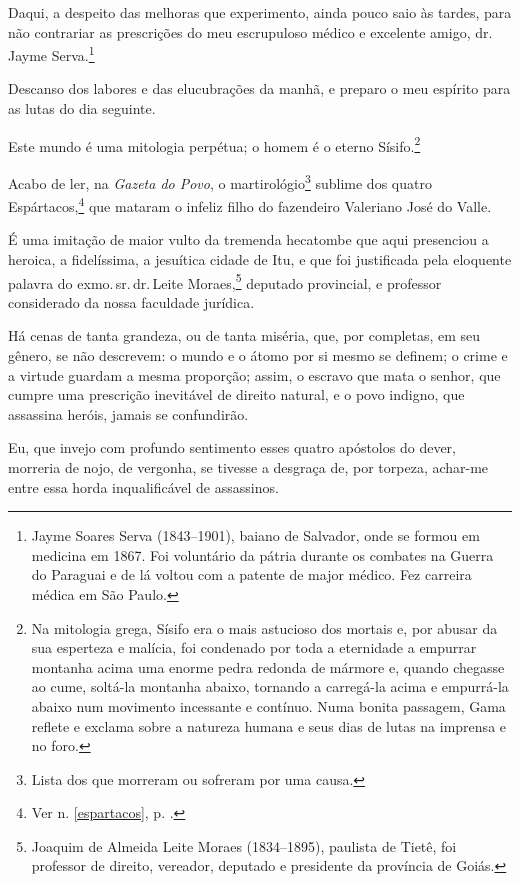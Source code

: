 Daqui, a despeito das melhoras que experimento, ainda pouco saio às
tardes, para não contrariar as prescrições do meu escrupuloso médico e
excelente amigo, dr.\,Jayme Serva.\footnote{Jayme Soares Serva
  (1843--1901), baiano de Salvador, onde se formou em medicina em 1867.
  Foi voluntário da pátria durante os combates na Guerra do Paraguai e
  de lá voltou com a patente de major médico. Fez carreira médica em São
  Paulo.}

Descanso dos labores e das elucubrações da manhã, e preparo o meu
espírito para as lutas do dia seguinte.

Este mundo é uma mitologia perpétua; o homem é o eterno Sísifo.\footnote{
  Na mitologia grega, Sísifo era o mais astucioso dos mortais e, por
  abusar da sua esperteza e malícia, foi condenado por toda a eternidade
  a empurrar montanha acima uma enorme pedra redonda de mármore e,
  quando chegasse ao cume, soltá-la montanha abaixo,
  tornando a carregá-la acima e empurrá-la abaixo num movimento
  incessante e contínuo. Numa bonita passagem, Gama reflete e exclama
  sobre a natureza humana e seus dias de lutas na imprensa e no foro.}

Acabo de ler, na \emph{Gazeta do Povo}, o martirológio\footnote{Lista
  dos que morreram ou sofreram por uma causa.} sublime dos quatro
Espártacos,\footnote{Ver n. \ref{espartacos}, p. \pageref{espartacos}.} que mataram o infeliz filho do fazendeiro Valeriano José do Valle.

É uma imitação de maior vulto da tremenda hecatombe que aqui presenciou
a heroica, a fidelíssima, a jesuítica cidade de Itu, e que foi
justificada pela eloquente palavra do exmo.\,sr.\,dr.\,Leite
Moraes,\footnote{Joaquim de Almeida Leite Moraes (1834--1895), paulista
  de Tietê, foi professor de direito, vereador, deputado e presidente da
  província de Goiás.} deputado provincial, e professor considerado da
nossa faculdade jurídica.

Há cenas de tanta grandeza, ou de tanta miséria, que, por completas, em
seu gênero, se não descrevem: o mundo e o átomo por si mesmo se definem;
o crime e a virtude guardam a mesma proporção; assim, o escravo que mata
o senhor, que cumpre uma prescrição inevitável de direito natural, e o
povo indigno, que assassina heróis, jamais se confundirão.

Eu, que invejo com profundo sentimento esses quatro apóstolos do dever,
morreria de nojo, de vergonha, se tivesse a desgraça de, por torpeza,
achar-me entre essa horda inqualificável de assassinos.


